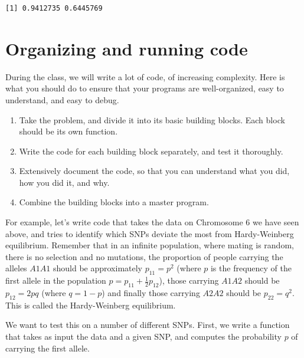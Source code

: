 \documentclass[
  letterpaper,
  DIV=11,
  numbers=noendperiod]{scrreprt}
\providecommand{\tightlist}{%
  \setlength{\itemsep}{0pt}\setlength{\parskip}{0pt}}\usepackage{longtable,booktabs,array}
\begin{document}
\begin{verbatim}
[1] 0.9412735 0.6445769
\end{verbatim}

\hypertarget{organizing-and-running-code}{%
\section{Organizing and running
code}\label{organizing-and-running-code}}

During the class, we will write a lot of code, of increasing complexity.
Here is what you should do to ensure that your programs are
well-organized, easy to understand, and easy to debug.

\begin{enumerate}
\def\labelenumi{\arabic{enumi}.}
\tightlist
\item
  Take the problem, and divide it into its basic building blocks. Each
  block should be its own function.
\item
  Write the code for each building block separately, and test it
  thoroughly.
\item
  Extensively document the code, so that you can understand what you
  did, how you did it, and why.
\item
  Combine the building blocks into a master program.
\end{enumerate}

For example, let's write code that takes the data on Chromosome 6 we
have seen above, and tries to identify which SNPs deviate the most from
Hardy-Weinberg equilibrium. Remember that in an infinite population,
where mating is random, there is no selection and no mutations, the
proportion of people carrying the alleles \(A1A1\) should be
approximately \(p_{11} = p^2\) (where \(p\) is the frequency of the
first allele in the population \(p = p_{11} + \frac{1}{2} p_{12}\)),
those carrying \(A1A2\) should be \(p_{12} = 2 p q\) (where \(q = 1-p\))
and finally those carrying \(A2A2\) should be \(p_{22} = q^2\). This is
called the Hardy-Weinberg equilibrium.

We want to test this on a number of different SNPs. First, we write a
function that takes as input the data and a given SNP, and computes the
probability \(p\) of carrying the first allele.
\end{document}

